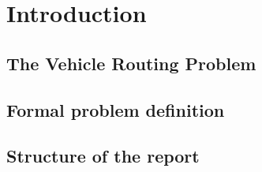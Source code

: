 \documentclass[main.tex]{subfiles}
\begin{document}
\section{Introduction}

\subsection{The Vehicle Routing Problem}

\subsection{Formal problem definition}

\subsection{Structure of the report}
\end{document}
